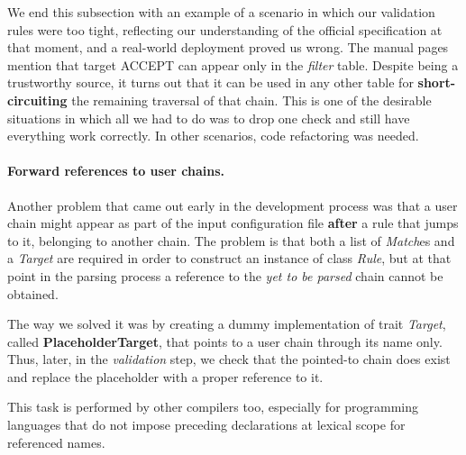 We end this subsection with an example of a scenario in which our validation
rules were too tight, reflecting our understanding of the official
specification at that moment, and a real-world deployment proved us wrong.  The
manual pages mention that target ACCEPT can appear only in the \emph{filter}
table.  Despite being a trustworthy source, it turns out that it can be used in
any other table for \textbf{short-circuiting} the remaining traversal of that
chain.  This is one of the desirable situations in which all we had to do was
to drop one check and still have everything work correctly.  In other
scenarios, code refactoring was needed.

\paragraph{Forward references to user chains.}
Another problem that came out early in the development process was that a user
chain might appear as part of the input configuration file \textbf{after} a
rule that jumps to it, belonging to another chain.  The problem is that both a
list of \emph{Match}es and a \emph{Target} are required in order to construct
an instance of class \emph{Rule}, but at that point in the parsing process a
reference to the \emph{yet to be parsed} chain cannot be obtained.

The way we solved it was by creating a dummy implementation of trait
\emph{Target}, called \textbf{PlaceholderTarget}, that points to a user chain
through its name only.  Thus, later, in the \emph{validation} step, we check
that the pointed-to chain does exist and replace the placeholder with a proper
reference to it.

This task is performed by other compilers too, especially for programming
languages that do not impose preceding declarations at lexical scope for
referenced names.

